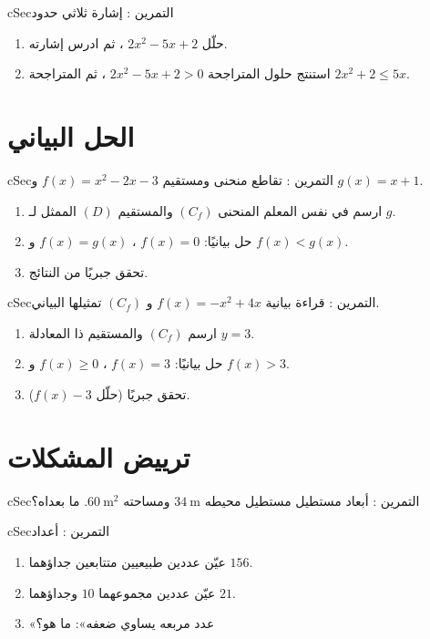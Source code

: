 \documentclass[12pt,a4paper]{article}
\newenvironment{BOX}[2]{\begin{otherlanguage}{english}\begin{arbox}{#1}{#2}}{\end{arbox}\end{otherlanguage}}
\newcounter{exo}
\newenvironment{tamrin}[1]{\stepcounter{exo}\begin{BOX}{cSec}{التمرين \theexo: #1}}{\end{BOX}}
\begin{document}
\begin{tamrin}{إشارة ثلاثي حدود}
\begin{enumerate}
\item حلّل $2x^2-5x+2$ ، ثم ادرس إشارته.
\item استنتج حلول المتراجحة $2x^2-5x+2>0$ ، ثم المتراجحة $2x^2+2\leqslant5x$.
\end{enumerate}
\end{tamrin}

\section{الحل البياني}
\begin{tamrin}{تقاطع منحنى ومستقيم}
$f(x)=x^2-2x-3$ و $g(x)=x+1$.
\begin{enumerate}
\item ارسم في نفس المعلم المنحنى $(C_f)$ والمستقيم $(D)$ الممثل لـ $g$.
\item حل بيانيًا: $f(x)=0$ ، $f(x)=g(x)$ و $f(x)<g(x)$.
\item تحقق جبريًا من النتائج.
\end{enumerate}
\end{tamrin}

\begin{tamrin}{قراءة بيانية}
$f(x)=-x^2+4x$ و $(C_f)$ تمثيلها البياني.
\begin{enumerate}
\item ارسم $(C_f)$ والمستقيم ذا المعادلة $y=3$.
\item حل بيانيًا: $f(x)=3$ ، $f(x)\geqslant0$ و $f(x)>3$.
\item تحقق جبريًا (حلّل $f(x)-3$).
\end{enumerate}
\end{tamrin}

\section{ترييض المشكلات}
\begin{tamrin}{أبعاد مستطيل}
مستطيل محيطه $34\ \text{m}$ ومساحته $60\ \text{m}^2$. ما بعداه؟
\end{tamrin}

\begin{tamrin}{أعداد}
\begin{enumerate}
\item عيّن عددين طبيعيين متتابعين جداؤهما $156$.
\item عيّن عددين مجموعهما $10$ وجداؤهما $21$.
\item «عدد مربعه يساوي ضعفه»: ما هو؟
\end{enumerate}
\end{tamrin}
\end{document}
